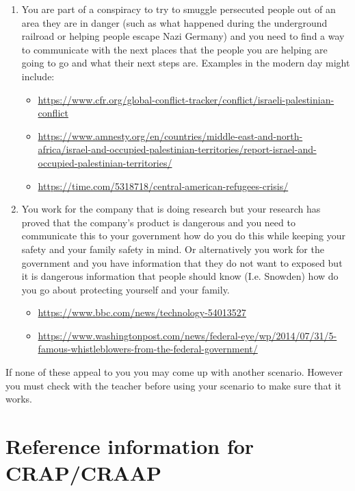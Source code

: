 \documentclass[12pt]{article}
\begin{document}
\begin{enumerate}
        \item You are part of a conspiracy to try to smuggle persecuted people out of an area they are in danger (such as what happened during the underground railroad or helping people escape Nazi Germany) and you need to find a way to communicate with the next places that the people you are helping are going to go and what their next steps are. Examples in the modern day might include:
        \begin{itemize}
            \item \url{https://www.cfr.org/global-conflict-tracker/conflict/israeli-palestinian-conflict}
            \item \url{https://www.amnesty.org/en/countries/middle-east-and-north-africa/israel-and-occupied-palestinian-territories/report-israel-and-occupied-palestinian-territories/}
            \item \url{https://time.com/5318718/central-american-refugees-crisis/}
        \end{itemize} 
        
        \item You work for the company that is doing research but your research has proved that the company's product is dangerous and you need to communicate this to your government how do you do this while keeping your safety and your family safety in mind. Or alternatively you work for the government and you have information that they do not want to exposed but it is dangerous information that people should know (I.e. Snowden) how do you go about protecting yourself and your family.
        \begin{itemize}
            \item \url{https://www.bbc.com/news/technology-54013527}
            \item \url{https://www.washingtonpost.com/news/federal-eye/wp/2014/07/31/5-famous-whistleblowers-from-the-federal-government/}
        \end{itemize} 



    \end{enumerate}

    If none of these appeal to you you may come up with another scenario. However you must check with the teacher before using your scenario to make sure that it works. 

\section*{Reference information for CRAP/CRAAP}
    
\end{document}
